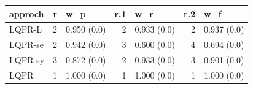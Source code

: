 \begin{tabular}{lrlrlrl}
\hline
 approch   &   r & w\_p         &   r.1 & w\_r         &   r.2 & w\_f         \\
\hline
 LQPR-L    &   2 & 0.950 (0.0) &     2 & 0.933 (0.0) &     2 & 0.937 (0.0) \\
 LQPR-se   &   2 & 0.942 (0.0) &     3 & 0.600 (0.0) &     4 & 0.694 (0.0) \\
 LQPR-sy   &   3 & 0.872 (0.0) &     2 & 0.933 (0.0) &     3 & 0.901 (0.0) \\
 LQPR      &   1 & 1.000 (0.0) &     1 & 1.000 (0.0) &     1 & 1.000 (0.0) \\
\hline
\end{tabular}